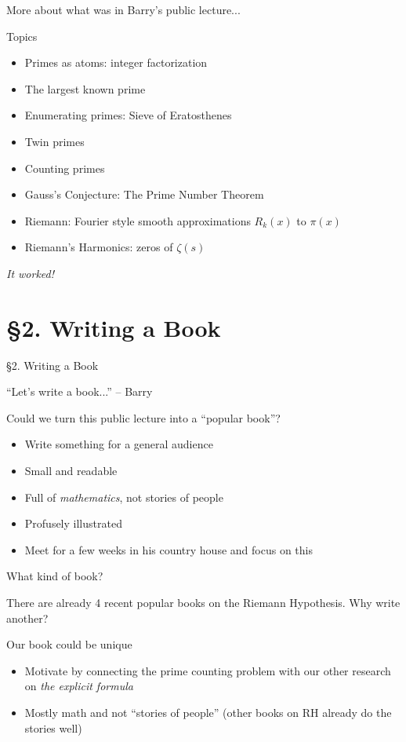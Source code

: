 \documentclass{beamer}
\newcommand{\mysection}[2]{\section{\S#1. #2}%
\begin{frame}{}
\vfill
\begin{center}
\hrulefill
\vfill
\Huge\sc \S#1. #2
\vfill
\hrulefill
\end{center}
\vfill
\end{frame}}
\begin{document}
\begin{frame}{More about what was in Barry's public lecture...}
  \begin{block}{Topics}
    \begin{itemize}
      \item Primes as atoms: integer factorization
      \item The largest known prime
      \item Enumerating primes: Sieve of Eratosthenes
      \item Twin primes
      \item Counting primes
      \item Gauss's Conjecture: The Prime Number Theorem
      \item Riemann: Fourier style smooth approximations $R_k(x)$ to $\pi(x)$
      \item Riemann's Harmonics: zeros of $\zeta(s)$
    \end{itemize}

  \end{block}

  \vfill
  \begin{center}
    \Large
    \emph{It worked!}
  \end{center}



\end{frame}

\mysection{2}{Writing a Book}

\begin{frame}{``Let's write a book...'' -- Barry}
  \begin{block}{Could we turn this public lecture into a ``popular book''?}

    \begin{itemize}
      \item Write something for a general audience
      \item Small and readable
      \item Full of {\em mathematics}, not stories of people
      \item Profusely illustrated
      \item Meet for a few weeks in his country house and focus on this
    \end{itemize}
  \end{block}
\end{frame}


\begin{frame}{What kind of book?}

  There are already 4 recent popular books on the Riemann Hypothesis.  Why write another?
  \vfill

  \begin{block}{Our book could be unique}
    \begin{itemize}
      \item Motivate by connecting the prime counting problem with our other research on {\em the explicit formula}
      \item Mostly math and not ``stories of people'' (other books on RH already do the stories well)
    \end{itemize}
  \end{block}
\end{frame}
\end{document}

